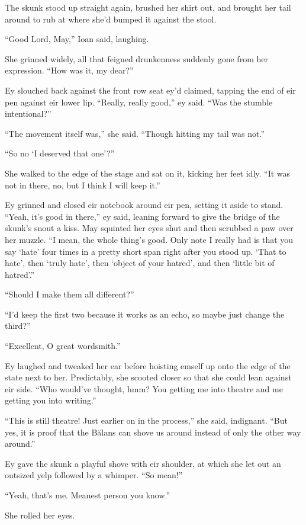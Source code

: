 The skunk stood up straight again, brushed her shirt out, and brought her tail around to rub at where she'd bumped it against the stool.

``Good Lord, May,'' Ioan said, laughing.

She grinned widely, all that feigned drunkenness suddenly gone from her expression. ``How was it, my dear?''

Ey slouched back against the front row seat ey'd claimed, tapping the end of eir pen against eir lower lip. ``Really, really good,'' ey said. ``Was the stumble intentional?''

``The movement itself was,'' she said. ``Though hitting my tail was not.''

``So no `I deserved that one'?''

She walked to the edge of the stage and sat on it, kicking her feet idly. ``It was not in there, no, but I think I will keep it.''

Ey grinned and closed eir notebook around eir pen, setting it aside to stand. ``Yeah, it's good in there,'' ey said, leaning forward to give the bridge of the skunk's snout a kiss. May squinted her eyes shut and then scrubbed a paw over her muzzle. ``I mean, the whole thing's good. Only note I really had is that you say `hate' four times in a pretty short span right after you stood up. `That to hate', then `truly hate', then `object of your hatred', and then `little bit of hatred'.''

``Should I make them all different?''

``I'd keep the first two because it works as an echo, so maybe just change the third?''

``Excellent, O great wordsmith.''

Ey laughed and tweaked her ear before hoisting emself up onto the edge of the state next to her. Predictably, she scooted closer so that she could lean against eir side. ``Who would've thought, hmm? You getting me into theatre and me getting you into writing.''

``This is still theatre! Just earlier on in the process,'' she said, indignant. ``But yes, it is proof that the Bălans can shove us around instead of only the other way around.''

Ey gave the skunk a playful shove with eir shoulder, at which she let out an outsized yelp followed by a whimper. ``So mean!''

``Yeah, that's me. Meanest person you know.''

She rolled her eyes.

